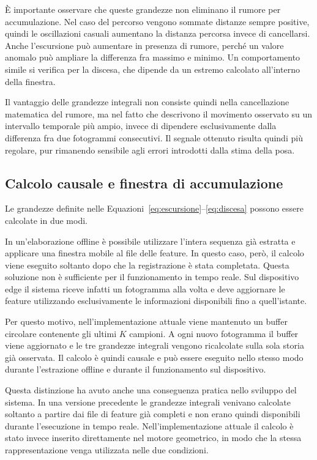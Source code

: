 È importante osservare che queste grandezze non eliminano il rumore per accumulazione.
Nel caso del percorso vengono sommate distanze sempre positive, quindi le oscillazioni casuali aumentano la distanza percorsa invece di cancellarsi. Anche l'escursione può aumentare in presenza di rumore, perché un valore anomalo può ampliare la differenza fra massimo e minimo. Un comportamento simile si verifica per la discesa, che dipende da un estremo calcolato all'interno della finestra.

Il vantaggio delle grandezze integrali non consiste quindi nella cancellazione matematica del rumore, ma nel fatto che descrivono il movimento osservato su un intervallo temporale più ampio, invece di dipendere esclusivamente dalla differenza fra due fotogrammi consecutivi. Il segnale ottenuto risulta quindi più regolare, pur rimanendo sensibile agli errori introdotti dalla stima della posa.

\subsection{Calcolo causale e finestra di accumulazione}

Le grandezze definite nelle Equazioni~\eqref{eq:escursione}--\eqref{eq:discesa} possono essere calcolate in due modi.

In un'elaborazione offline è possibile utilizzare l'intera sequenza già estratta e applicare una finestra mobile al file delle feature. In questo caso, però, il calcolo viene eseguito soltanto dopo che la registrazione è stata completata. Questa soluzione non è sufficiente per il funzionamento in tempo reale. Sul dispositivo edge il sistema riceve infatti un fotogramma alla volta e deve aggiornare le feature utilizzando esclusivamente le informazioni disponibili fino a quell'istante.

Per questo motivo, nell'implementazione attuale viene mantenuto un buffer circolare contenente gli ultimi \(K\) campioni. A ogni nuovo fotogramma il buffer viene aggiornato e le tre grandezze integrali vengono ricalcolate sulla sola storia già osservata. Il calcolo è quindi causale e può essere eseguito nello stesso modo durante l'estrazione offline e durante il funzionamento sul dispositivo.

Questa distinzione ha avuto anche una conseguenza pratica nello sviluppo del sistema. In una versione precedente le grandezze integrali venivano calcolate soltanto a partire dai file di feature già completi e non erano quindi disponibili durante l'esecuzione in tempo reale. Nell'implementazione attuale il calcolo è stato invece inserito direttamente nel motore geometrico, in modo che la stessa rappresentazione venga utilizzata nelle due condizioni.

